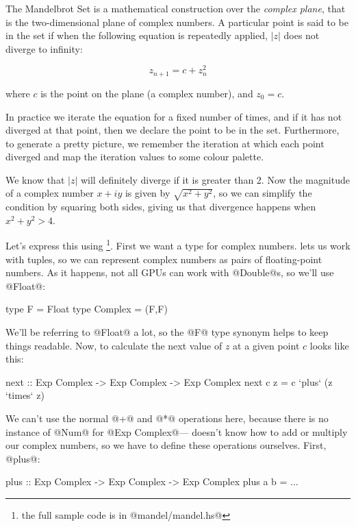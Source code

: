 The Mandelbrot Set is a mathematical construction over the
\emph{complex plane}, that is the two-dimensional plane of complex
numbers.  A particular point is said to be in the set if when the
following equation is repeatedly applied, $|z|$ does not diverge to
infinity:

\[
  z_{n+1} = c + z_n^2
\]

where $c$ is the point on the plane (a complex number), and $z_0 = c$.

In practice we iterate the equation for a fixed number of times, and
if it has not diverged at that point, then we declare the point to be
in the set.  Furthermore, to generate a pretty picture, we remember
the iteration at which each point diverged and map the iteration
values to some colour palette.

We know that $|z|$ will definitely diverge if it is greater than 2.
Now the magnitude of a complex number $x + iy$ is given by $\sqrt{x^2
  + y^2}$, so we can simplify the condition by squaring both sides,
giving us that divergence happens when $x^2 + y^2 > 4$.

Let's express this using \acc{}\footnote{the full sample code is in
  @mandel/mandel.hs@}.  First we want a type for complex numbers.
\acc{} lets us work with tuples, so we can represent complex numbers
as pairs of floating-point numbers.  As it happens, not all GPUs can
work with @Double@s, so we'll use @Float@:

\begin{haskell}
type F       = Float
type Complex = (F,F)
\end{haskell}

We'll be referring to @Float@ a lot, so the @F@ type synonym helps to
keep things readable.  Now, to calculate the next value of $z$ at a
given point $c$ looks like this:

\begin{haskell}
next :: Exp Complex -> Exp Complex -> Exp Complex
next c z = c `plus` (z `times` z)
\end{haskell}

\noindent We can't use the normal @+@ and @*@ operations here, because
there is no instance of @Num@ for @Exp Complex@---\acc{} doesn't know
how to add or multiply our complex numbers, so we have to define these
operations ourselves.  First, @plus@:

\begin{haskell}
plus :: Exp Complex -> Exp Complex -> Exp Complex
plus a b = ...
\end{haskell}

